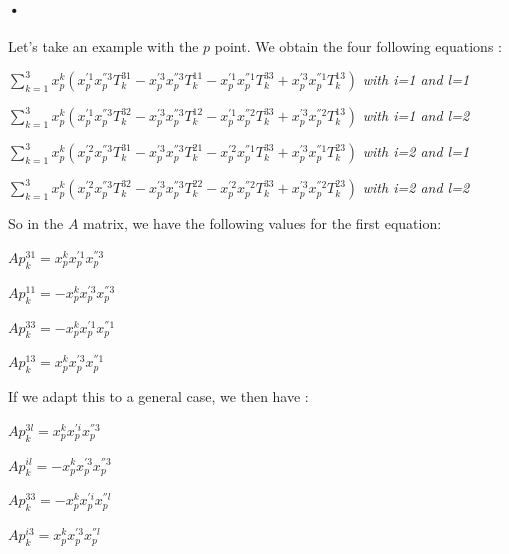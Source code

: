 \documentclass{report}
\begin{document}
\paragraph{•}
Let's take an example with the $p$ point. 
We obtain the four following equations : 
\begin{center}
 $ \displaystyle { \sum_{k = 1}^{3}} x_{p}^{k}(x_{p}^{'1}x_{p}^{''3}T_{k}^{31} - x_{p}^{'3}x_{p}^{''3}T_{k}^{11} - x_{p}^{'1}x_{p}^{''1}T_{k}^{33} + x_{p}^{'3}x_{p}^{''1}T_{k}^{13})$  \textit{with i=1 and l=1}
\end{center}
\begin{center}
 $ \displaystyle { \sum_{k = 1}^{3}} x_{p}^{k}(x_{p}^{'1}x_{p}^{''3}T_{k}^{32} - x_{p}^{'3}x_{p}^{''3}T_{k}^{12} - x_{p}^{'1}x_{p}^{''2}T_{k}^{33} + x_{p}^{'3}x_{p}^{''2}T_{k}^{13})$  \textit{with i=1 and l=2} 
\end{center}
\begin{center}
 $ \displaystyle { \sum_{k = 1}^{3}} x_{p}^{k}(x_{p}^{'2}x_{p}^{''3}T_{k}^{31} - x_{p}^{'3}x_{p}^{''3}T_{k}^{21} - x_{p}^{'2}x_{p}^{''1}T_{k}^{33} + x_{p}^{'3}x_{p}^{''1}T_{k}^{23})$  \textit{with i=2 and l=1} 
\end{center}
\begin{center}
 $ \displaystyle { \sum_{k = 1}^{3}} x_{p}^{k}(x_{p}^{'2}x_{p}^{''3}T_{k}^{32} - x_{p}^{'3}x_{p}^{''3}T_{k}^{22} - x_{p}^{'2}x_{p}^{''2}T_{k}^{33} + x_{p}^{'3}x_{p}^{''2}T_{k}^{23})$  \textit{with i=2 and l=2} 
\end{center}

So in the $A$ matrix, we have the following values for the first equation: 
\begin{center}
$Ap_{k}^{31} = x_{p}^{k}x_{p}^{'1}x_{p}^{''3}$
\end{center}
\begin{center}
$Ap_{k}^{11} = - x_{p}^{k}x_{p}^{'3}x_{p}^{''3}$
\end{center}
\begin{center}
$Ap_{k}^{33} = -x_{p}^{k} x_{p}^{'1}x_{p}^{''1}$
\end{center}
\begin{center}
$Ap_{k}^{13} = x_{p}^{k}x_{p}^{'3}x_{p}^{''1}$
\end{center}

If we adapt this to a general case, we then have  : 
\begin{center}
$Ap_{k}^{3l} = x_{p}^{k}x_{p}^{'i}x_{p}^{''3}$
\end{center}
\begin{center}
$Ap_{k}^{il} = - x_{p}^{k}x_{p}^{'3}x_{p}^{''3}$
\end{center}
\begin{center}
$Ap_{k}^{33} = -x_{p}^{k} x_{p}^{'i}x_{p}^{''l}$
\end{center}
\begin{center}
$Ap_{k}^{i3} = x_{p}^{k}x_{p}^{'3}x_{p}^{''l}$
\end{center}
\end{document}
